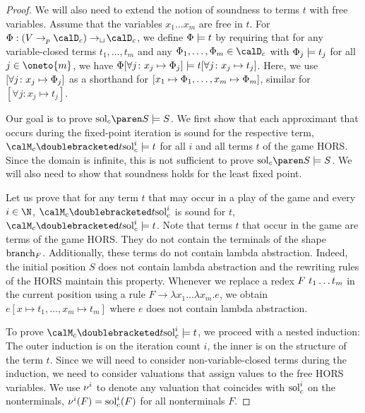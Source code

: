 \documentclass[../../diss.tex]{subfiles}
\begin{document}
\begin{proof}
    We will also need to extend the notion of soundness to terms $t$ with free variables.
    Assume that the variables $x_1 \ldots x_m$ are free in $t$.
    For $\judgment : (V\pto \domainc) \cto \domainc$, we define
    $\Phi \models t$
    by requiring that for any variable-closed terms
    $t_1, \ldots, t_m$
    and any
    $\judgment_1, \ldots, \judgment_m \in \domainc$
    with $\Phi_j \models t_j$ for all $j \in \oneto{m}$,
    we have
    $\Phi [\forall j \colon x_j \mapsto \Phi_j]
    \models
    t [\forall j \colon x_j \mapsto t_j]$.
    Here, we use $[\forall j \colon x_j \mapsto \Phi_j]$ as a shorthand for $[x_1 \mapsto \Phi_1, \ldots, x_m \mapsto \Phi_m]$, similar for $[\forall j \colon x_j \mapsto t_j]$.

    Our goal is to prove $\solc{S} \gamesound S$.
    We first show that each approximant that occurs during the fixed-point iteration is sound for the respective term, \ie $\semc{t}{\solc^i} \gamesound t$ for all $i$ and all terms $t$ of the game HORS.\@
    Since the domain is infinite, this is not sufficient to prove $\solc{S} \gamesound S$.
    We will also need to show that soundness holds for the least fixed point.

    Let us prove that for any term $t$ that may occur in a play of the game and every $i \in \N$, $\semc{t}{\solc^i}$ is sound for $t$, $\semc{t}{\solc^i} \gamesound t$.
    Note that terms $t$ that occur in the game are terms of the game HORS.\@
    They do not contain the terminals of the shape $\text{branch}_F$.
    Additionally, these terms do not contain lambda abstraction.
    Indeed, the initial position $S$ does not contain lambda abstraction and the rewriting rules of the HORS maintain this property.
    Whenever we replace a redex $F \  t_1 \ldots t_m$ in the current position using a rule $F \to \lambda x_1 \ldots \lambda x_m . e$, we obtain $e [ x \mapsto t_1, \ldots, x_m \mapsto t_m]$ where $e$ does not contain lambda abstraction.

    To prove $\semc{t}{\solc^i} \gamesound t$, we proceed with a nested induction:
    The outer induction is on the iteration count $i$, the inner is on the structure of the term $t$.
    Since we will need to consider non-variable-closed terms during the induction, we need to consider valuations that assign values to the free HORS variables.
    We use $\nu^i$ to denote any valuation that coincides with $\solc^i$ on the nonterminals, \ie $\val^i(F) = \solc^i(F)$ for all nonterminals $F$.


\end{proof}
\end{document}
